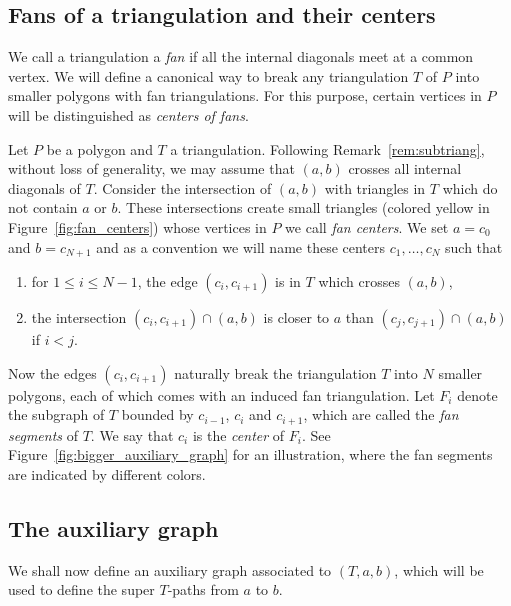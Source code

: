 \subsection{Fans of a triangulation and their centers}

We call a triangulation a \emph{fan} if all the internal diagonals meet at a common vertex.
We will define a canonical way to break any triangulation $T$ of $P$ into smaller polygons with fan triangulations.
For this purpose, certain vertices in $P$ will be distinguished as \emph{centers of fans}.



Let $P$ be a polygon and $T$ a triangulation. Following Remark~\ref{rem:subtriang}, without loss of generality, we may assume that
$(a,b)$ crosses all internal diagonals of $T$.
Consider the intersection of $(a,b)$ with triangles in $T$ which do not contain $a$ or $b$.
These intersections create small triangles (colored yellow in Figure~\ref{fig:fan_centers}) whose vertices in $P$ we call \emph{fan centers}.
We set $a=c_0$ and $b=c_{N+1}$ and as a convention we will name these centers $c_1,\dots,c_N$ such that
\begin{enumerate}\itemsep=0pt
 \item[1)] for $1\leq i\leq N-1$, the edge $(c_i,c_{i+1})$ is in $T$ which crosses $(a,b)$,
 \item[2)] the intersection $(c_i,c_{i+1}) \cap (a,b)$ is closer to $a$ than $(c_j,c_{j+1}) \cap (a,b)$ if $i<j$.
\end{enumerate}

Now the edges $(c_i,c_{i+1})$ naturally break the triangulation $T$ into $N$ smaller polygons, each of which
comes with an induced fan triangulation. Let $F_i$ denote the subgraph of $T$ bounded by $c_{i-1}$, $c_{i}$ and $c_{i+1}$,
which are called the \emph{fan segments} of $T$. We say that $c_i$ is the \emph{center} of $F_i$.
 See Figure~\ref{fig:bigger_auxiliary_graph} for an illustration, where the fan segments are indicated by different colors.

\subsection{The auxiliary graph}

We shall now define an auxiliary graph associated to $(T,a,b)$, which will be used to define the super $T$-paths from $a$ to $b$.
	
